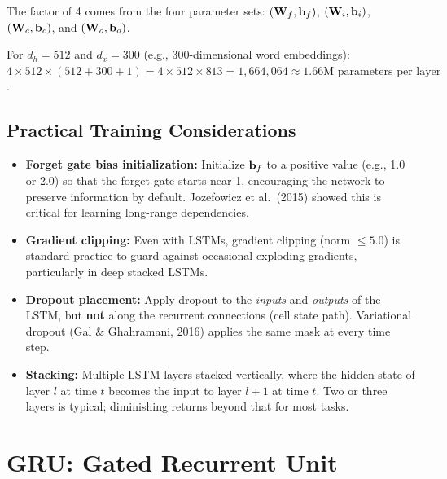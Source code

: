 \noindent The factor of 4 comes from the four parameter sets:
$(\mathbf{W}_f, \mathbf{b}_f)$, $(\mathbf{W}_i, \mathbf{b}_i)$, $(\mathbf{W}_c, \mathbf{b}_c)$, and
$(\mathbf{W}_o, \mathbf{b}_o)$.

\begin{example}
For $d_h = 512$ and $d_x = 300$ (e.g., 300-dimensional word embeddings):
$4 \times 512 \times (512 + 300 + 1) = 4 \times 512 \times 813
= 1{,}664{,}064 \approx 1.66\text{M parameters per layer}$.
\end{example}

\subsection{Practical Training Considerations}

\begin{itemize}[leftmargin=*]
\item \textbf{Forget gate bias initialization:} Initialize $\mathbf{b}_f$ to a
  positive value (e.g., 1.0 or 2.0) so that the forget gate starts near 1,
  encouraging the network to preserve information by default.  Jozefowicz
  et al.\ (2015) showed this is critical for learning long-range
  dependencies.

\item \textbf{Gradient clipping:} Even with LSTMs, gradient clipping (norm
  $\leq 5.0$) is standard practice to guard against occasional exploding
  gradients, particularly in deep stacked LSTMs.

\item \textbf{Dropout placement:} Apply dropout to the \emph{inputs} and
  \emph{outputs} of the LSTM, but \textbf{not} along the recurrent
  connections (cell state path).  Variational dropout (Gal \& Ghahramani,
  2016) applies the same mask at every time step.

\item \textbf{Stacking:} Multiple LSTM layers stacked vertically, where the
  hidden state of layer $l$ at time $t$ becomes the input to layer $l+1$ at
  time $t$.  Two or three layers is typical; diminishing returns beyond that
  for most tasks.
\end{itemize}


\section{GRU: Gated Recurrent Unit}
\label{sec:gru}

